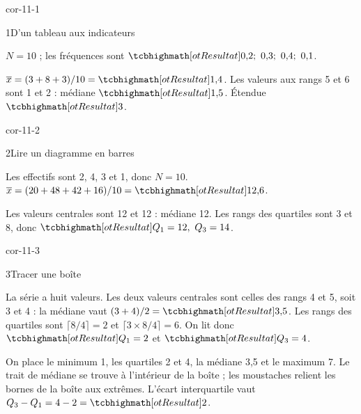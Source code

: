 \corrigesSouples

\begin{blocLivre}{cor-11-1}
\begin{corrige}{1}{D’un tableau aux indicateurs}
\begin{questions}
\item $N=10$ ; les fréquences sont $\res{0{,}2;\ 0{,}3;\ 0{,}4;\ 0{,}1}$.
\item $\overline x=(3+8+3)/10=\res{1{,}4}$. Les valeurs aux rangs 5 et 6 sont 1 et 2 : médiane $\res{1{,}5}$. Étendue $\res{3}$.
\end{questions}
\end{corrige}
\end{blocLivre}
\begin{blocLivre}{cor-11-2}
\begin{corrige}{2}{Lire un diagramme en barres}
\begin{questions}
\item Les effectifs sont 2, 4, 3 et 1, donc $N=10$. $\overline x=(20+48+42+16)/10=\res{12{,}6}$.
\item Les valeurs centrales sont 12 et 12 : médiane 12. Les rangs des quartiles sont 3 et 8, donc $\res{Q_1=12,\ Q_3=14}$.
\end{questions}
\end{corrige}
\end{blocLivre}
\begin{blocLivre}{cor-11-3}
\begin{corrige}{3}{Tracer une boîte}
\begin{questions}
\item La série a huit valeurs. Les deux valeurs centrales sont celles des rangs 4 et 5, soit 3 et 4 :
la médiane vaut $(3+4)/2=\res{3{,}5}$.
Les rangs des quartiles sont $\lceil8/4\rceil=2$ et $\lceil3\times8/4\rceil=6$.
On lit donc $\res{Q_1=2}$ et $\res{Q_3=4}$.
\item On place le minimum 1, les quartiles 2 et 4, la médiane 3,5 et le maximum 7.
Le trait de médiane se trouve à l’intérieur de la boîte ; les moustaches relient les bornes de la boîte aux extrêmes.
L’écart interquartile vaut $Q_3-Q_1=4-2=\res{2}$.
\end{questions}

\label{figlivre-r11-03-boite-cor}

\end{corrige}
\end{blocLivre}
